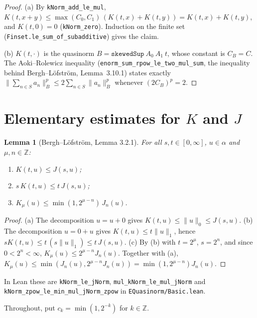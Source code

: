 \documentclass[11pt]{article}
\newtheorem{lemma}[theorem]{Lemma}
\theoremstyle{definition}
\theoremstyle{remark}
\newcommand{\norm}[2]{\lVert #1\rVert_{#2}}
\newcommand{\Z}{\mathbb Z}
\begin{document}
\begin{proof}
  (a) By \texttt{kNorm\_add\_le\_mul},
  \(K(t,x+y) \le \max(C_0,C_1)\,(K(t,x) + K(t,y)) = K(t,x) + K(t,y)\), and \(K(t,0) = 0\)
  (\texttt{kNorm\_zero}). Induction on the finite set (\texttt{Finset.le\_sum\_of\_subadditive})
  gives the claim.

  (b) \(K(t,\cdot)\) is the quasinorm \(B = \texttt{skewedSup}\ A_0\ A_1\ t\), whose constant is
  \(C_B = C\). The Aoki--Rolewicz inequality (\texttt{enorm\_sum\_rpow\_le\_two\_mul\_sum}, the
  inequality behind Bergh--L\"ofstr\"om, Lemma~3.10.1) states exactly
  \(\lVert\sum_{n\in S} a_n\rVert_B^p \le 2\sum_{n\in S}\norm{a_n}{B}^p\) whenever
  \((2C_B)^p = 2\).
\end{proof}

\section{Elementary estimates for \texorpdfstring{\(K\)}{K} and \texorpdfstring{\(J\)}{J}}

\begin{lemma}[Bergh--L\"ofstr\"om, Lemma 3.2.1]\label{lem:KJ}
  For all \(s, t \in [0,\infty]\), \(u \in \alpha\) and \(\mu, n \in \Z\):
  \begin{enumerate}
    \item[(a)] \(K(t,u) \le J(s,u)\);
    \item[(b)] \(s\,K(t,u) \le t\,J(s,u)\);
    \item[(c)] \(K_\mu(u) \le \min(1, 2^{\mu-n})\,J_n(u)\).
  \end{enumerate}
\end{lemma}

\begin{proof}
  (a) The decomposition \(u = u + 0\) gives
  \(K(t,u) \le \norm{u}{0} \le J(s,u)\). (b) The decomposition \(u = 0 + u\) gives
  \(K(t,u) \le t\norm{u}{1}\), hence \(sK(t,u) \le t\,(s\norm{u}{1}) \le t\,J(s,u)\).
  (c) By (b) with \(t = 2^\mu\), \(s = 2^n\), and since \(0 < 2^n < \infty\),
  \(K_\mu(u) \le 2^{\mu-n}J_n(u)\). Together with (a),
  \(K_\mu(u) \le \min(J_n(u), 2^{\mu-n}J_n(u)) = \min(1,2^{\mu-n})J_n(u)\).
\end{proof}

In Lean these are \texttt{kNorm\_le\_jNorm}, \texttt{mul\_kNorm\_le\_mul\_jNorm} and
\texttt{kNorm\_zpow\_le\_min\_mul\_jNorm\_zpow} in \texttt{EQuasinorm/Basic.lean}.

Throughout, put \(c_k = \min(1, 2^{-k})\) for \(k \in \Z\).
\end{document}
